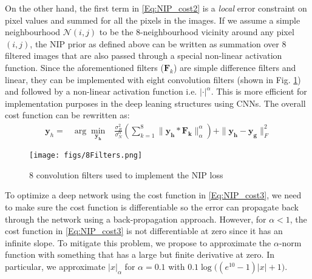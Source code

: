 \documentclass[9pt]{article}
\newcommand{\vect}[1]{\pmb{#1}}
\newcommand{\mat}[1]{\pmb{#1}}
\def\bea{\begin{eqnarray}}
\def\eea{\end{eqnarray}}
\begin{document}
On the other hand, the first term in \eqref{Eq:NIP_cost2} is a \emph{local} error constraint on pixel values and summed for all the pixels in the images. If we assume a simple neighbourhood $\mathcal{N}(i,j)$ to be the 8-neighbourhood vicinity around any pixel $(i,j)$, the NIP prior as defined above can be written as summation over $8$ filtered images  that are also passed through a special non-linear activation function. Since the aforementioned filters ($\mat F_k$) are simple difference filters and linear, they can be implemented with eight convolution filters (shown in Fig. \ref{Fig:Filters}) and followed by a non-linear activation function i.e. $|\cdot|^\alpha$. This is more efficient for implementation purposes in the deep leaning structures using CNNs. %
The overall cost function can be rewritten as:
\bea
    \vect y_h = &\arg\min\limits_{\vect{y_h}}   &  \frac{\sigma_R^2}{\sigma_N^\alpha}  \left(\sum\limits_{k=1}^{8}   \|\mat{y_h} \ast \mat{F_k}  \|_\alpha^\alpha \right) +
                                    \| \mat{y_h}  - \mat{y_g} \|_F^2 \label{Eq:NIP_cost3}
\eea
\begin{figure}
  \centering
  \texttt{[image: figs/8Filters.png]}\vspace{-0.15in}
  \caption{ 8 convolution filters used to implement the NIP loss}
  \label{Fig:Filters}
\end{figure}
To optimize a deep network using the cost function in \eqref{Eq:NIP_cost3}, we need to make sure the cost function is differentiable so the error can propagate back through the network using a back-propagation approach. However, for $\alpha <1$, the cost function in \eqref{Eq:NIP_cost3} is not differentiable at zero since it has an infinite slope. %
To mitigate this problem, we propose to approximate the $\alpha$-norm function with something that has a large but finite derivative at zero. In particular,  we approximate $|x|_\alpha$ for $\alpha=0.1$ with $0.1 \log\Big((e^{10}-1)|x|+1\Big)$. %
\end{document}
